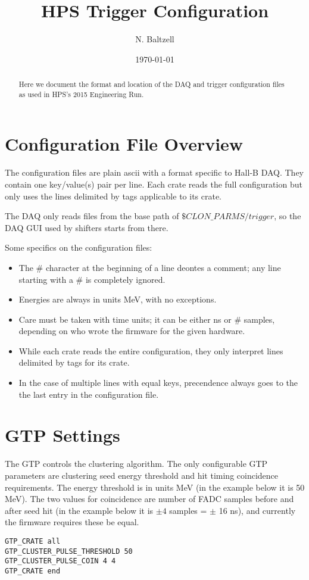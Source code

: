 \documentclass[amsmath,amssymb,notitlepage,11pt]{revtex4-1}
\begin{document}

\title{HPS Trigger Configuration}
\author{N. Baltzell}
\date{\today}
\begin{abstract}
Here we document the format and location of the DAQ and trigger configuration files as used in HPS's 2015 Engineering Run. 
\end{abstract}
\maketitle

\section{Configuration File Overview}
The configuration files are plain ascii with a format specific to Hall-B DAQ.  They contain one key/value(s) pair per line.  Each crate reads the full configuration but only uses the lines delimited by tags applicable to its crate.  

The DAQ only reads files from the base path of $\$CLON\_PARMS/trigger$, so the DAQ GUI used by shifters starts from there. 

Some specifics on the configuration files:
\begin{itemize}
    \item The \# character at the beginning of a line deontes a comment;  any line starting with a \# is completely ignored.
    \item Energies are always in units MeV, with no exceptions.
    \item Care must be taken with time units;  it can be either ns or \# samples, depending on who wrote the firmware for the given hardware.
    \item While each crate reads the entire configuration, they only interpret lines delimited by tags for its crate.
    \item In the case of multiple lines with equal keys, precendence always goes to the the last entry in the configuration file.
\end{itemize}

\section{GTP Settings}
The GTP controls the clustering algorithm.  The only configurable GTP parameters are clustering seed energy threshold and hit timing coincidence requirements.  The energy threshold is in units MeV (in the example below it is 50 MeV).  The two values for coincidence are number of FADC samples before and after seed hit (in the example below it is $\pm 4$ samples = $\pm$ 16 ns), and  currently the firmware requires these be equal.
\begin{verbatim}
GTP_CRATE all
GTP_CLUSTER_PULSE_THRESHOLD 50
GTP_CLUSTER_PULSE_COIN 4 4
GTP_CRATE end
\end{verbatim}
\end{document}
